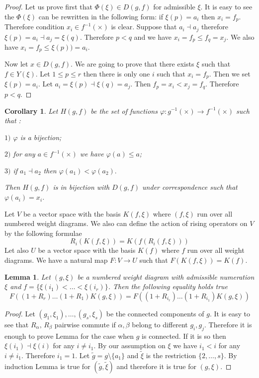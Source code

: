 \documentclass[12pt,reqno]{amsart}
\newtheorem{corollary}[thm]{Corollary}
\newtheorem{lemma}[thm]{Lemma}
\begin{document}
\begin{proof}  Let us prove first that  $\Phi(\xi)\in D(g,f)$ for admissible $\xi$. It is easy to see the $\Phi(\xi)$ can be rewritten in the following form: if $\xi(p)=a_i$ then $x_i=f_p$. Therefore condition $x_i\in f^{-1}(\times)$ is clear. Suppose that $a_i\dashv a_j$  therefore 
$\xi(p)=a_i\dashv a_j=\xi(q)$. Therefore $p<q$  and we have $x_i=f_p\le f_q=x_j.$  We also have $x_i=f_p\le \xi(p))=a_i$.

Now let $x\in D(g,f)$. We are going to prove that there exists $\xi$ such that $f\in Y(\xi)$. 
 Let $1\le p\le r$ then there is only one $i$ such that $x_i=f_p$. Then we set $\xi(p)=a_i$. Let $a_i=\xi(p)\dashv\xi(q)=a_j$.  Then $f_p=x_i<x_j=f_q$. Therefore $p<q$. 
 
  
\end{proof}
\begin{corollary}   Let $H(g,f)$ be the set of functions $\varphi: g^{-1}(\times)\rightarrow f^{-1}(\times)$ such that :

$1)$ $\varphi$ is a bijection;

$2)$ for any $a\in f^{-1}(\times)$ we have $\varphi(a)\le a$;

$3)$ if $a_1\dashv a_2$ then $\varphi(a_1)<\varphi(a_2).$ 

Then $H(g,f)$  is in bijection with $D(g,f)$ under correspondence  such that $\varphi(a_i)=x_i$.
\end{corollary}

 Let $V$ be a vector space with the basis $K( f,\xi)$ where $(f,\xi)$ run over  all  numbered weight diagrams.  We also can define the action of rising operators on $V$ by the following formulae
 $$
R_i(K(f,\xi))= K(f(R_i(f,\xi)))
 $$
 Let also $U$ be a vector space with the basis $K(f)$ where $f$ run over all weight diagrams. We have a natural map $F: V\rightarrow U$  such that $F(K(f,\xi))=K(f)$.
 
 \begin{lemma}\label{prod}  Let $(g,\xi)$ be a numbered weight  diagram  with admissible  numeration $\xi$ and  $f=\{\xi(i_1)<\dots<\xi(i_r)\}$.  Then   the following equality holds true
$$
F((1+R_{r})\dots(1+R_{1})K(g,\xi))=F((1+R_{i_r})\dots(1+R_{i_1})K(g,\xi))
$$

\end{lemma}
\begin{proof} 


Let  $(g_1,\xi_1),\dots,(g_s,\xi_s)$ be the connected  components of $g$.   It is easy to see that $R_{\alpha},\,R_{\beta}$ pairwise commute  if $\alpha,\beta$ belong to different  $g_i,g_j$. Therefore it is enough  to prove Lemma for the case when $g$ is connected. If it is so  then $\xi(i_1)\dashv \xi(i)$ for any $i\ne i_1$. By our assumption on $\xi$ we have $i_1<i$ for any $i\ne i_1$. Therefore $i_1=1$. Let $\tilde g=g\setminus\{a_1\}$ and $\tilde \xi$ is the restriction  $\{2,\dots,s\}$. By induction Lemma is true for $(\tilde g,\tilde\xi)$ and therefore  it is true for $(g,\xi).$
\end{proof}
\end{document}
